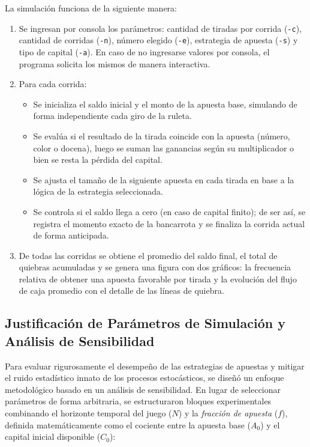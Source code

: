 \documentclass{article}
\begin{document}
La simulación funciona de la siguiente manera:
\begin{enumerate}
  \item Se ingresan por consola los parámetros: cantidad de tiradas por corrida (\texttt{-c}), cantidad de corridas (\texttt{-n}), número elegido (\texttt{-e}), estrategia de apuesta (\texttt{-s}) y tipo de capital (\texttt{-a}). En caso de no ingresarse valores por consola, el programa solicita los mismos de manera interactiva.
  \item Para cada corrida:
    \begin{itemize}
      \item Se inicializa el saldo inicial y el monto de la apuesta base, simulando de forma independiente cada giro de la ruleta.
      \item Se evalúa si el resultado de la tirada coincide con la apuesta (número, color o docena), luego se suman las ganancias según su multiplicador o bien se resta la pérdida del capital.
      \item Se ajusta el tamaño de la siguiente apuesta en cada tirada en base a la lógica de la estrategia seleccionada.
      \item Se controla si el saldo llega a cero (en caso de capital finito); de ser así, se registra el momento exacto de la bancarrota y se finaliza la corrida actual de forma anticipada.
    \end{itemize}
    \item De todas las corridas se obtiene el promedio del saldo final, el total de quiebras acumuladas y se genera una figura con dos gráficos: la frecuencia relativa de obtener una apuesta favorable por tirada y la evolución del flujo de caja promedio con el detalle de las líneas de quiebra.
\end{enumerate}

\subsection{Justificación de Parámetros de Simulación y Análisis de Sensibilidad}

Para evaluar rigurosamente el desempeño de las estrategias de apuestas y mitigar el ruido estadístico innato de los procesos estocásticos, se diseñó un enfoque metodológico basado en un análisis de sensibilidad. En lugar de seleccionar parámetros de forma arbitraria, se estructuraron bloques experimentales combinando el horizonte temporal del juego ($N$) y la \textit{fracción de apuesta} ($f$), definida matemáticamente como el cociente entre la apuesta base ($A_0$) y el capital inicial disponible ($C_0$):
\end{document}
